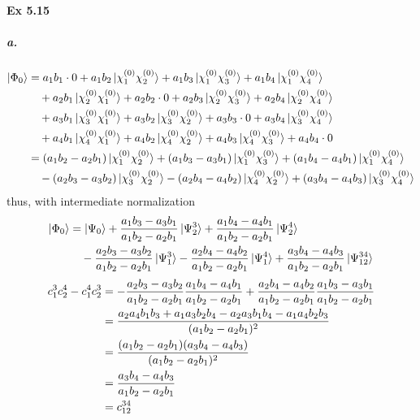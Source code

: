 \documentclass[a4paper]{article}
\newcommand{\ex}[1]{\paragraph{Ex #1}}
\newcommand{\subex}[1]{\subparagraph{#1}}
\numberwithin{equation}{subsection}
\begin{document}



\ex{5.15}
\subex{a.}
\begin{align}
\Ket{\Phi_0} &= 
a_1b_1\cdot 0 + a_1 b_2 \ket{\chi_1^{(0)}\chi_2^{(0)}} 
+ a_1 b_3\ket{\chi_1^{(0)}\chi_3^{(0)}} + a_1 b_4\ket{\chi_1^{(0)}\chi_4^{(0)}}
\notag\\
&\quad{} + a_2 b_1\ket{\chi_2^{(0)}\chi_1^{(0)}} + a_2 b_2\cdot 0
+ a_2 b_3\ket{\chi_2^{(0)}\chi_3^{(0)}} + a_2 b_4\ket{\chi_2^{(0)}\chi_4^{(0)}}
\notag\\
&\quad{}
+ a_3 b_1\ket{\chi_3^{(0)}\chi_1^{(0)}} + a_3 b_2\ket{\chi_3^{(0)}\chi_2^{(0)}}
+ a_3 b_3\cdot 0 + a_3 b_4\ket{\chi_3^{(0)}\chi_4^{(0)}}
\notag\\
&\quad{}
+ a_4 b_1\ket{\chi_4^{(0)}\chi_1^{(0)}} + a_4 b_2\ket{\chi_4^{(0)}\chi_2^{(0)}}
+ a_4 b_3\ket{\chi_4^{(0)}\chi_3^{(0)}} + a_4 b_4\cdot 0
\notag\\
&= (a_1 b_2 - a_2 b_1) \ket{\chi_1^{(0)}\chi_2^{(0)}} 
+ (a_1 b_3 - a_3 b_1)\ket{\chi_1^{(0)}\chi_3^{(0)}} 
+ (a_1 b_4 - a_4 b_1)\ket{\chi_1^{(0)}\chi_4^{(0)}} \notag\\
&\quad{}
- (a_2 b_3 - a_3 b_2)\ket{\chi_3^{(0)}\chi_2^{(0)}} 
- (a_2 b_4 - a_4 b_2)\ket{\chi_4^{(0)}\chi_2^{(0)}}
+ (a_3 b_4 - a_4 b_3)\ket{\chi_3^{(0)}\chi_4^{(0)}}
\end{align}
thus, with intermediate normalization
\begin{align}
\Ket{\Phi_0} &= \ket{\Psi_0} 
+ \dfrac{a_1 b_3 - a_3 b_1}{a_1 b_2 - a_2 b_1}\ket{\Psi_2^3} 
+ \dfrac{a_1 b_4 - a_4 b_1}{a_1 b_2 - a_2 b_1}\ket{\Psi_2^4} \notag\\
&\quad{}
- \dfrac{a_2 b_3 - a_3 b_2}{a_1 b_2 - a_2 b_1}\ket{\Psi_1^3} 
- \dfrac{a_2 b_4 - a_4 b_2}{a_1 b_2 - a_2 b_1}\ket{\Psi_1^4}
+ \dfrac{a_3 b_4 - a_4 b_3}{a_1 b_2 - a_2 b_1}\ket{\Psi_{12}^{34}} 
\end{align}
\begin{align}
c_1^3 c_2^4 - c_1^4 c_2^3 &= -\dfrac{a_2 b_3 - a_3 b_2}{a_1 b_2 - a_2 b_1}\dfrac{a_1 b_4 - a_4 b_1}{a_1 b_2 - a_2 b_1} + \dfrac{a_2 b_4 - a_4 b_2}{a_1 b_2 - a_2 b_1}\dfrac{a_1 b_3 - a_3 b_1}{a_1 b_2 - a_2 b_1} \notag\\
&= \dfrac{a_2a_4b_1b_3 + a_1a_3b_2b_4 - a_2a_3b_1b_4 - a_1a_4b_2b_3}{(a_1 b_2 - a_2 b_1)^2} \notag\\
&= \dfrac{(a_1b_2 - a_2b_1)(a_3b_4-a_4b_3) }{(a_1 b_2 - a_2 b_1)^2} \notag\\
&= \dfrac{a_3b_4-a_4b_3 }{a_1 b_2 - a_2 b_1} \notag\\
&= c_{12}^{34}
\end{align}
\end{document}
